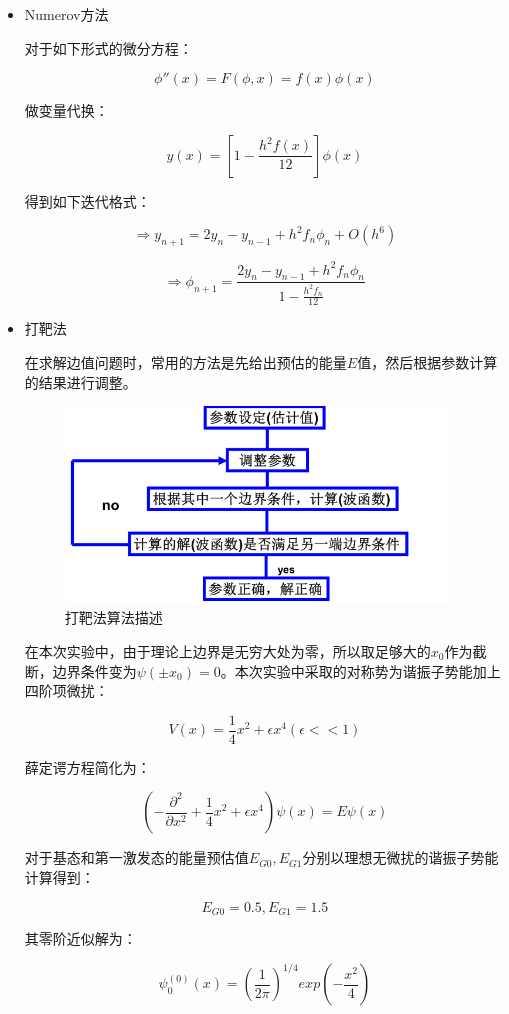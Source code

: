 \documentclass[UTF8]{ctexart}
\begin{document}
	\begin{itemize}
		\item Numerov方法
		
		对于如下形式的微分方程：
		
		$$\phi''(x)=F(\phi,x)=f(x)\phi(x)$$
		
		做变量代换：
		
		$$y(x)=\left[ 1-\frac{h^2f(x)}{12}\right]\phi(x) $$
		
		得到如下迭代格式：
		
		$$\Rightarrow y_{n+1}=2y_{n}-y_{n-1}+h^2f_n\phi_n+O(h^6)$$
		
		$$\Rightarrow \phi_{n+1}=\frac{2y_{n}-y_{n-1}+h^2f_n\phi_n}{1-\frac{h^2f_n}{12}}$$
		
		\item 打靶法
		
		在求解边值问题时，常用的方法是先给出预估的能量$E$值，然后根据参数计算的结果进行调整。
		
			\begin{figure}[H]
				\centering\includegraphics[width=4in]{1}
				\caption{打靶法算法描述}
				\end{figure}
			
		在本次实验中，由于理论上边界是无穷大处为零，所以取足够大的$x_0$作为截断，边界条件变为$\psi(\pm x_0)=0$。本次实验中采取的对称势为谐振子势能加上四阶项微扰：
		
		$$V(x)=\frac{1}{4}x^2+\epsilon x^4(\epsilon<<1)$$ 
		
		薛定谔方程简化为：
		
		$$\left( -\frac{\partial^2}{\partial x^2}+\frac{1}{4}x^2+\epsilon x^4\right) \psi(x)=E\psi(x)$$
		
		对于基态和第一激发态的能量预估值$E_{G0},E_{G1}$分别以理想无微扰的谐振子势能计算得到：
		
		$$E_{G0}=0.5,E_{G1}=1.5$$
		
		其零阶近似解为：
		
		$$\psi_0^{(0)}(x)=\left( \frac{1}{2\pi}\right) ^{1/4}exp(-\frac{x^2}{4})$$
		

\end{itemize}
\end{document}
